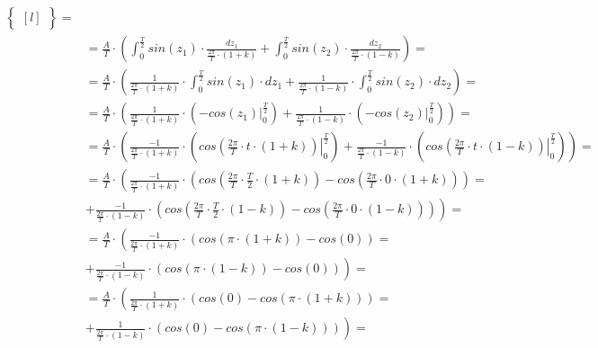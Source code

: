 \begin{task}
\begin{align*}
\begin{Bmatrix*}[l]
\end{Bmatrix*}=\\
&=\frac{A}{T} \cdot \left(\int_{0}^{\frac{T}{2}} sin\left( z_1 \right)\cdot \frac{dz_1}{\frac{2\pi}{T} \cdot \left(1+k\right)}  + \int_{0}^{\frac{T}{2}} sin\left( z_2\right) \cdot \frac{dz_2}{\frac{2\pi}{T} \cdot \left(1-k\right)}\right)=\\
&=\frac{A}{T} \cdot \left(\frac{1}{\frac{2\pi}{T}\cdot \left(1+k\right)} \cdot \int_{0}^{\frac{T}{2}} sin\left( z_1 \right)\cdot dz_1 + \frac{1}{\frac{2\pi}{T} \cdot \left(1-k\right)} \cdot \int_{0}^{\frac{T}{2}} sin\left( z_2\right) \cdot dz_2 \right)=\\
&=\frac{A}{T} \cdot \left(\frac{1}{\frac{2\pi}{T}\cdot \left(1+k\right)} \cdot \left( \left. -cos\left( z_1 \right) \right|_{0}^{\frac{T}{2}} \right) + \frac{1}{\frac{2\pi}{T} \cdot \left(1-k\right)} \cdot \left(\left. -cos\left( z_2\right) \right|_{0}^{\frac{T}{2}} \right) \right)=\\
&=\frac{A}{T} \cdot \left(\frac{-1}{\frac{2\pi}{T}\cdot \left(1+k\right)} \cdot \left( \left. cos\left( \frac{2\pi}{T} \cdot t \cdot \left(1+k\right) \right) \right|_{0}^{\frac{T}{2}} \right) + \frac{-1}{\frac{2\pi}{T} \cdot \left(1-k\right)} \cdot \left(\left. cos\left( \frac{2\pi}{T} \cdot t \cdot \left(1-k\right)\right) \right|_{0}^{\frac{T}{2}} \right) \right)=\\
&=\frac{A}{T} \cdot \left(\frac{-1}{\frac{2\pi}{T}\cdot \left(1+k\right)} \cdot \left( cos\left( \frac{2\pi}{T} \cdot \frac{T}{2} \cdot \left(1+k\right) \right) - cos\left( \frac{2\pi}{T} \cdot 0 \cdot \left(1+k\right) \right) \right) \right.=\\
&\left.+ \frac{-1}{\frac{2\pi}{T} \cdot \left(1-k\right)} \cdot \left( cos\left( \frac{2\pi}{T} \cdot \frac{T}{2} \cdot \left(1-k\right)\right) -  cos\left( \frac{2\pi}{T} \cdot 0 \cdot \left(1-k\right)\right) \right) \right)=\\
&=\frac{A}{T} \cdot \left(\frac{-1}{\frac{2\pi}{T}\cdot \left(1+k\right)} \cdot \left( cos\left(\pi \cdot \left(1+k\right) \right) - cos\left( 0 \right) \right) \right.=\\
&\left.+ \frac{-1}{\frac{2\pi}{T} \cdot \left(1-k\right)} \cdot \left( cos\left(\pi \cdot \left(1-k\right)\right) -  cos\left( 0 \right) \right) \right)=\\
&=\frac{A}{T} \cdot \left(\frac{1}{\frac{2\pi}{T}\cdot \left(1+k\right)} \cdot \left( cos\left( 0 \right) - cos\left(\pi \cdot \left(1+k\right) \right) \right) \right.=\\
&\left.+ \frac{1}{\frac{2\pi}{T} \cdot \left(1-k\right)} \cdot \left( cos\left( 0 \right) - cos\left(\pi \cdot \left(1-k\right)\right) \right) \right)=\\

\end{align*}
\end{task}
